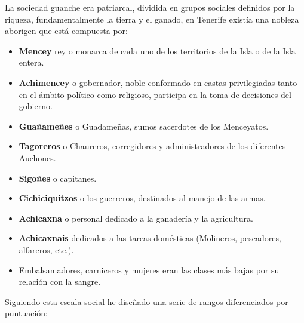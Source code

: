 La sociedad guanche era patriarcal\cite{sociedadguanche}, dividida en grupos sociales definidos por la riqueza, fundamentalmente la tierra y el ganado, en Tenerife existía una nobleza aborigen que está compuesta por:
\begin{itemize}
\item \textbf{Mencey} rey o monarca de cada uno de los territorios de la Isla o de la Isla entera.
\item \textbf{Achimencey} o gobernador, noble conformado en castas privilegiadas tanto en el ámbito político como religioso, participa en la toma de decisiones del gobierno.
\item \textbf{Guañameñes} o Guadameñas, sumos sacerdotes de los Menceyatos.
\item \textbf{Tagoreros} o Chaureros, corregidores y administradores de los diferentes Auchones.
\item \textbf{Sigoñes} o capitanes.
\item \textbf{Cichiciquitzos} o los guerreros, destinados al manejo de las armas.
\item \textbf{Achicaxna} o personal dedicado a la ganadería y la agricultura.
\item \textbf{Achicaxnais} dedicados a las tareas domésticas (Molineros, pescadores, alfareros, etc.). 
\item Embalsamadores, carniceros y mujeres eran las clases más bajas por su relación con la sangre.\cite{pou2017carniceros}
\end{itemize}

Siguiendo esta escala social he diseñado una serie de rangos diferenciados por puntuación:

